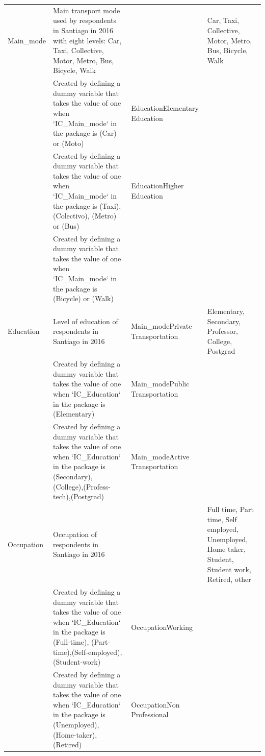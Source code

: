\documentclass[
11pt, %
oneside, %
english, %
singlespacing, %
]{macthesis} %
\begin{document}
\begin{longtable}[t]{l>{\raggedright\arraybackslash}p{10em}>{\raggedright\arraybackslash}p{10em}>{\raggedright\arraybackslash}p{10em}}
\hspace{1em}Main\_mode & Main transport mode used by respondents in Santiago in 2016 with eight levels: Car, Taxi, Collective, Motor, Metro, Bus, Bicycle, Walk &  & Car, Taxi, Collective, Motor, Metro, Bus, Bicycle, Walk\\
\hspace{1em} & Created by defining a dummy variable that takes the value of one when `IC\_Main\_mode` in the package is  (Car) or (Moto) & EducationElementary Education & \\
\hspace{1em} & Created by defining a dummy variable that takes the value of one when `IC\_Main\_mode` in the package is  (Taxi), (Colectivo), (Metro) or (Bus) & EducationHigher Education & \\
\hspace{1em} & Created by defining a dummy variable that takes the value of one when `IC\_Main\_mode` in the package is  (Bicycle) or (Walk) &  & \\
\hspace{1em}Education & Level of education of respondents in Santiago in 2016 & Main\_modePrivate Transportation & Elementary, Secondary, Professor, College, Postgrad\\
\hspace{1em} & Created by defining a dummy variable that takes the value of one when `IC\_Education` in the package is  (Elementary) & Main\_modePublic Transportation & \\
\hspace{1em} & Created by defining a dummy variable that takes the value of one when `IC\_Education` in the package is (Secondary), (College),(Profess-tech),(Postgrad) & Main\_modeActive Transportation & \\
\hspace{1em}Occupation & Occupation of respondents in Santiago in 2016 &  & Full time, Part time, Self employed, Unemployed, Home taker, Student, Student work, Retired, other\\
\hspace{1em} & Created by defining a dummy variable that takes the value of one when `IC\_Education` in the package is (Full-time), (Part-time),(Self-employed),(Student-work) & OccupationWorking & \\
\hspace{1em} & Created by defining a dummy variable that takes the value of one when `IC\_Education` in the package is (Unemployed), (Home-taker),(Retired) & OccupationNon Professional & \\

\end{longtable}
\end{document}
